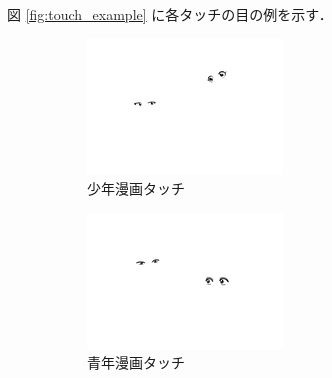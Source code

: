 \documentclass[onecolumn]{ujarticle}     %
\begin{document}
	図 \ref{fig:touch_example} に各タッチの目の例を示す．
	\begin{figure}[t]
		\vspace{-4mm}
		\centering
		\begin{subfigure}{0.49\columnwidth}
			\centering
			\includegraphics[width=1.2\columnwidth]{eye_shonen.png}
			\caption{少年漫画タッチ}
			\label{fig:shonen}
		\end{subfigure}
		\begin{subfigure}{0.49\columnwidth}
			\centering
			\includegraphics[width=1.2\columnwidth]{eye_seinen.png}
			\caption{青年漫画タッチ}
			\label{fig:seinen}
		\end{subfigure}
		\begin{subfigure}{0.49\columnwidth}
			\centering

\end{subfigure}
\end{figure}
\end{document}
